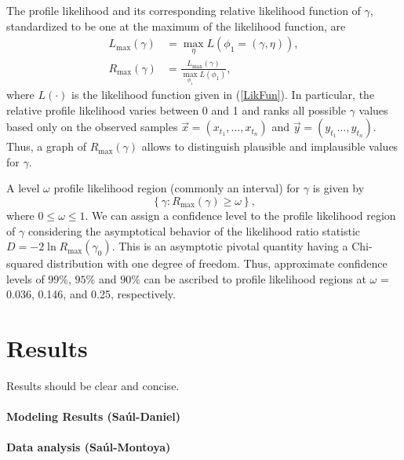 \documentclass{imammb}
\numberwithin{equation}{section}
\begin{document}
The profile likelihood and its corresponding relative likelihood function of $\gamma$, standardized to be one at the maximum of the likelihood function, are
\begin{equation}
\begin{split}
L_{\max}\left(\gamma\right)&=\max_{\eta}L\left(\phi_{1}=\left(\gamma,\eta \right)\right),  \nonumber \\
R_{\max}\left(\gamma\right)&=\frac{L_{\max}\left(\gamma\right)}{\displaystyle\max_{\phi_{1}}L\left(\phi_{1}\right)},
\end{split}
\end{equation}
where $L\left(\cdot\right)$ is the likelihood function given in (\ref{LikFun}). In particular, the relative profile likelihood varies between 0 and 1 and ranks all possible $\gamma$ values based only on the observed samples $\vec{x}=\left(x_{t_1}, \dots , x_{t_n} \right)$ and $\vec{y}=\left(y_{t_1} \dots , y_{t_n} \right)$. Thus, a graph of $R_{\max}\left(\gamma\right)$ allows to distinguish plausible and implausible values for $\gamma$.

A level $\omega$ profile likelihood region (commonly an interval) for $\gamma$ is given by
\begin{equation}
\left\{\gamma: R_{\max}\left(\gamma\right) \geq \omega \right\}, \nonumber
\end{equation}
where $0 \leq \omega \leq 1$. We can assign a confidence level to the profile likelihood region of $\gamma$  considering the asymptotical behavior of the likelihood ratio statistic $D=-2\ln{R_{\max}\left(\gamma_{0}\right)}$. This is an asymptotic pivotal quantity having a Chi-squared distribution with one degree of freedom. Thus, approximate confidence levels of $99\%$, $95\%$ and $90\%$ can be ascribed to profile likelihood regions at $\omega$ = 0.036, 0.146, and 0.25, respectively.

	\section{Results}
		Results should be clear and concise.
		\paragraph{Modeling Results (Saúl-Daniel)}



\paragraph{Data analysis (Saúl-Montoya)}
\end{document}

